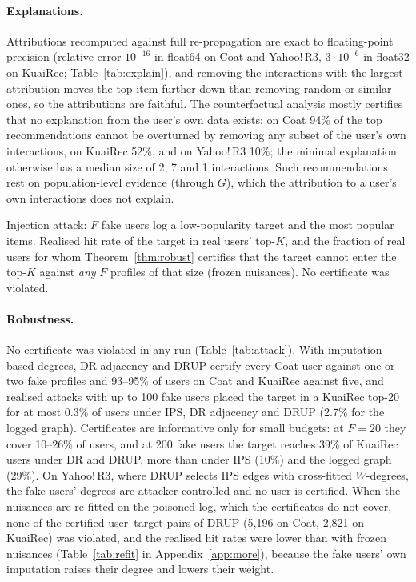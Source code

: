 \paragraph{Explanations.} Attributions recomputed against full re-propagation
are exact to floating-point precision (relative error $10^{-16}$ in float64 on
Coat and Yahoo!\,R3, $3\cdot10^{-6}$ in float32 on KuaiRec; Table~\ref{tab:explain}), and removing the
interactions with the largest attribution moves the top item further down than
removing random or similar ones, so the attributions are faithful. The
counterfactual analysis mostly certifies that no explanation from the user's
own data exists: on Coat 94\% of the top recommendations cannot be overturned by removing any subset of the user's own interactions, on KuaiRec 52\%, and on Yahoo!\,R3 10\%; the minimal explanation otherwise has a median size of 2, 7 and 1 interactions. Such recommendations rest on population-level
evidence (through $G$), which the attribution to a user's own interactions does
not explain.

\begin{table}[t]\centering\small
\caption{Injection attack: $F$ fake users log a low-popularity target and the most
popular items. Realised hit rate of the target in real users' top-$K$, and the
fraction of real users for whom Theorem~\ref{thm:robust} certifies that the target
cannot enter the top-$K$ against \emph{any} $F$ profiles of that size (frozen
nuisances). No certificate was violated.}\label{tab:attack}
\begin{adjustbox}{max width=\textwidth}

\end{adjustbox}
\end{table}

\paragraph{Robustness.} No certificate was violated in any run
(Table~\ref{tab:attack}). With imputation-based degrees, DR adjacency and DRUP
certify every Coat user against one or two fake profiles and 93--95\% of users on
Coat and KuaiRec against five, and realised attacks with up to 100 fake users
placed the target in a KuaiRec top-20 for at most 0.3\% of users under IPS, DR adjacency and
DRUP (2.7\% for the logged graph). Certificates are informative only
for small budgets: at $F=20$ they cover 10--26\% of users, and at 200 fake users
the target reaches 39\% of KuaiRec users under DR and DRUP, more than under IPS
(10\%) and the logged graph (29\%). On Yahoo!\,R3, where DRUP selects IPS edges with
cross-fitted $W$-degrees, the fake users' degrees are attacker-controlled and no
user is certified. When the nuisances are re-fitted on the poisoned log, which
the certificates do not cover, none of the certified user--target pairs of DRUP (5{,}196 on Coat, 2{,}821 on KuaiRec)
was violated, and the realised hit rates were lower than with frozen nuisances
(Table~\ref{tab:refit} in Appendix~\ref{app:more}), because the fake users' own
imputation raises their degree and lowers their weight.

